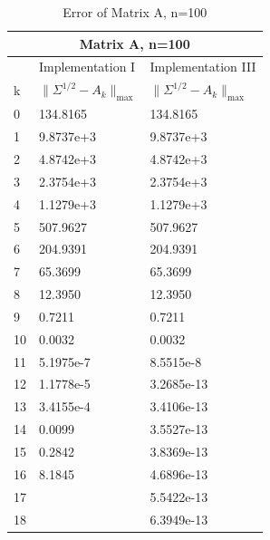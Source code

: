\begin{table}
\begin{center}
\label{Table: A100}
\begin{tabular}{| l | l | l | }

	\hline
	\multicolumn{3}{|c|}{Matrix A, n=100}  \\
	\hline
	   & Implementation I & Implementation III \\
	k & $\parallel \Sigma^{1/2} - A_{k}\parallel_{\text{max}}$ & $\parallel \Sigma^{1/2} - A_{k}\parallel_{\text{max}}$  \\	
	\hline
	0 &  134.8165& 134.8165 \\
	1 & 9.8737e+3&  9.8737e+3\\
	2 & 4.8742e+3&  4.8742e+3  \\
	3 & 2.3754e+3& 2.3754e+3 \\
	4 & 1.1279e+3& 1.1279e+3 \\
	5 & 507.9627& 507.9627  \\
	6 & 204.9391& 204.9391  \\
	7 & 65.3699& 65.3699 \\
	8 & 12.3950& 12.3950 \\
	9 & 0.7211& 0.7211  \\
	10& 0.0032& 0.0032\\ 
	11& 5.1975e-7&8.5515e-8\\
	12&1.1778e-5& 3.2685e-13 \\
	13&3.4155e-4 & 3.4106e-13 \\
	14&0.0099& 3.5527e-13\\
	15&0.2842 & 3.8369e-13\\
	16& 8.1845 & 4.6896e-13\\
	17& & 5.5422e-13\\
	18& & 6.3949e-13\\

	\hline
	
\end{tabular}
\caption{Error of Matrix A, n=100}
\end{center}
\end{table}


